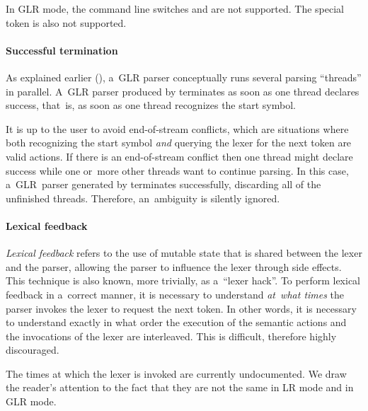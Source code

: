 In GLR mode, the command line switches
\oexncarriesstate and \ofixedexc are not supported.
%
The special token \error is also not supported.

\paragraph{Successful termination}

As explained earlier (),
a~GLR parser conceptually runs
several parsing ``threads''
in parallel.
%
A~GLR parser produced by \menhir
terminates as soon as
one thread declares success,
that~is,
as soon as
one thread recognizes the start symbol.

It is up to the user
to avoid end-of-stream conflicts,
which are situations where
both
recognizing the start symbol
\emph{and}
querying the lexer for the next token
are valid actions.
%
If there is an end-of-stream conflict
then
one thread might declare success
while one or~more other threads
want to continue parsing.
%
In this case,
a~GLR~parser generated by \menhir
terminates successfully,
discarding all of the unfinished threads.
%
Therefore, an~ambiguity is silently ignored.

\paragraph{Lexical feedback}

\emph{Lexical feedback} refers to the use of mutable state that is shared
between the lexer and the parser, allowing the parser to influence the lexer
through side effects.
This technique is also known, more trivially, as a~``lexer hack''.
%
To perform lexical feedback in a~correct manner,
it is necessary to understand
\emph{at~what times} the parser invokes the lexer
to request the next token.
%
In other words, it is necessary to understand exactly
in what order
the execution of the semantic actions
and the invocations of the lexer
are interleaved.
%
This is difficult,
therefore highly discouraged.

The times at which the lexer is invoked
are currently undocumented.
%
We draw the reader's attention to the fact that they are not the same
in LR mode and in GLR mode.


